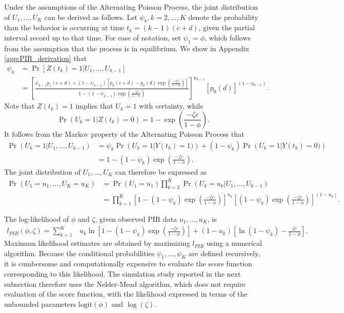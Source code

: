 \documentclass[man, noextraspace, floatsintext]{apa6}\usepackage[]{graphicx}\usepackage[]{color}
\newcommand{\logit}{\text{logit}}
\begin{document}
Under the assumptions of the Alternating Poisson Process, the joint distribution of $U_1,...,U_K$ can be derived as follows. Let $\psi_k, k = 2,...,K$ denote the probability than the behavior is occurring at time $t_k = (k-1)(c + d)$, given the partial interval record up to that time. For ease of notation, set $\psi_1 = \phi$, which follows from the assumption that the process is in equilibrium. We show in Appendix \ref{app:PIR_derivation} that  
\begin{equation}
\label{eq:psi_k}
\begin{aligned}
\psi_k &= \Pr\left[ Z(t_k) = 1 \left| U_1,...,U_{k-1}\right.\right] \\
 &= \left[\frac{\psi_{k-1} p_1(c + d) + (1 - \psi_{k-1}) \left[p_0(c + d) - p_0(d) \exp\left(\frac{- \zeta c}{1 - \phi}\right)\right]}{1 - (1 - \psi_{k-1})\exp\left( \frac{-\zeta c}{1 - \phi}\right)}\right]^{u_{k-1}} \left[p_0(d)\right]^{(1 - u_{k-1})}.
\end{aligned}
\end{equation}
Note that $Z(t_k) = 1$ implies that $U_k = 1$ with certainty, while 
\[ \Pr\left(U_k = 1\left| Z(t_k) = 0\right.\right) = 1 - \exp\left( \frac{-\zeta c}{1 - \phi}\right).\]
It follows from the Markov property of the Alternating Poisson Process that 
\begin{align*}
\Pr\left(U_k = 1 \left| U_1,...,U_{k-1}\right.\right) &= \psi_k \Pr\left(U_k = 1 \left| Y(t_k) = 1)\right.\right)  + (1 - \psi_k)\Pr\left(U_k = 1 \left| Y(t_k) = 0)\right.\right) \\
&= 1 - (1 - \psi_k)\exp\left( \frac{-\zeta c}{1 - \phi}\right).
\end{align*}
The joint distribution of $U_1,...,U_K$ can therefore be expressed as 
\begin{align*}
\Pr\left(U_1=u_1,...,U_K = u_K\right) &= \Pr\left(U_1=u_1\right) \prod_{k=2}^K \Pr\left(U_k=u_k \left| U_1,...,U_{k-1}\right.\right) \nonumber \\
&= \prod_{k=1}^K \left[1 - (1 - \psi_k)\exp\left( \frac{-\zeta c}{1 - \phi}\right) \right]^{u_k} \left[(1 - \psi_k)\exp\left( \frac{-\zeta c}{1 - \phi}\right)\right]^{(1 - u_k)}.
\end{align*}

The log-likelihood of $\phi$ and $\zeta$, given observed PIR data $u_1,...,u_K$, is
\begin{align}
\label{eq:log_lik}
l_{PIR}\left(\phi,\zeta\right) = \sum_{k=1}^K & u_k \ln\left[1 - (1 - \psi_k)\exp\left( \frac{-\zeta c}{1 - \phi}\right)\right]  + (1 - u_k)\left[\ln\left(1 - \psi_k \right) - \frac{\zeta c}{1 - \phi}\right].
\end{align}
Maximum likelihood estimates are obtained by maximizing $l_{PIR}$ using a numerical algorithm. Because the conditional probabilities $\psi_1,...,\psi_K$ are defined recursively, it is cumbersome and computationally expensive to evaluate the score function corresponding to this likelihood. The simulation study reported in the next subsection therefore uses the Nelder-Mead algorithm, which does not require evaluation of the score function, with the likelihood expressed in terms of the unbounded parameters $\logit(\phi)$ and $\log(\zeta)$.
\end{document}
